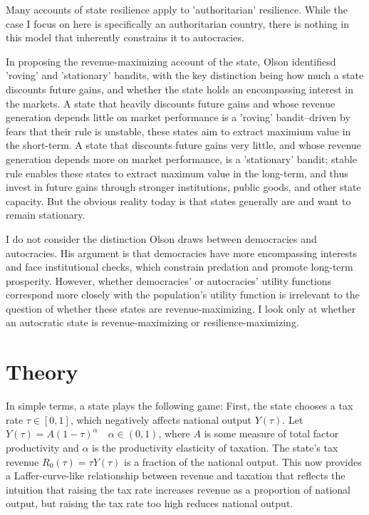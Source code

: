 \documentclass[bibtex,nonblind]{apsr_submission}
\begin{document}
Many accounts of state resilience apply to 'authoritarian' resilience. While the case I focus on here is specifically an authoritarian country, there is nothing in this model that inherently constrains it to autocracies.

In proposing the revenue-maximizing account of the state, Olson \cite{olson1993} identifiesd 'roving' and 'stationary' bandits, with the key distinction being how much a state discounts future gains, and whether the state holds an encompassing interest in the markets. A state that heavily discounts future gains and whose revenue generation depends little on market performance is a 'roving' bandit--driven by fears that their rule is unstable, these states aim to extract maximium value in the short-term. A state that discounts future gains very little, and whose revenue generation depends more on market performance, is a 'stationary' bandit; stable rule enables these states to extract maximum value in the long-term, and thus invest in future gains through stronger institutions, public goods, and other state capacity. But the obvious reality today is that states generally are and want to remain stationary.

I do not consider the distinction Olson \cite{olson1993} draws between democracies and autocracies. His argument is that democracies have more encompassing interests and face institutional checks, which constrain predation and promote long-term prosperity. However, whether democracies' or autocracies' utility functions correspond more closely with the population's utility function is irrelevant to the question of whether these states are revenue-maximizing. I look only at whether an autocratic state is revenue-maximizing or resilience-maximizing.


\section{Theory}

In simple terms, a state plays the following game: First, the state chooses a tax rate $\tau \in [0,1]$, which negatively affects national output $Y(\tau)$. Let $Y(\tau) = A(1-\tau)^{ \alpha} \quad \alpha \in (0,1)$, where $A$ is some measure of total factor productivity and $\alpha$ is the productivity elasticity of taxation. The state's tax revenue $R_0(\tau)=\tau Y(\tau)$ is a fraction of the national output. This now provides a Laffer-curve-like relationship between revenue and taxation that reflects the intuition that raising the tax rate increases revenue as a proportion of national output, but raising the tax rate too high reduces national output.
\end{document}
